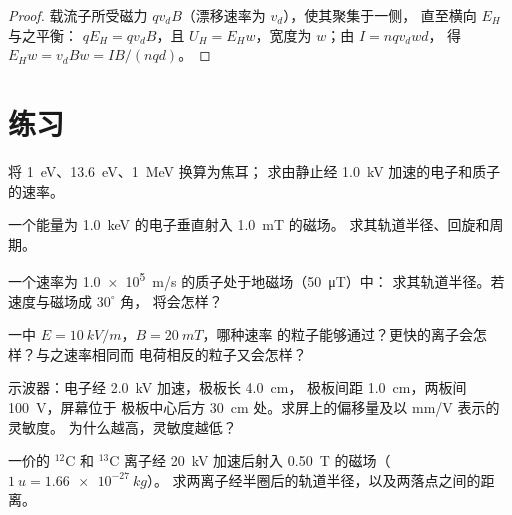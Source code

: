 \begin{proof}
载流子所受磁力 $qv_dB$（漂移速率为 $v_d$），使其聚集于一侧，
直至横向 $E_H$ 与之平衡：
$qE_H = qv_dB$，且 $U_H = E_Hw$，宽度为 $w$；由 $I = nqv_dwd$，
得 $E_Hw = v_dBw = IB/(nqd)$。
\end{proof}

\section{练习}

\begin{exercise}[$\star$]\label{exo:b1:charged-particles:1}
将 \qty{1}{eV}、\qty{13.6}{eV}、\qty{1}{MeV} 换算为焦耳；
求由静止经 \qty{1.0}{kV} 加速的电子和质子的速率。
\end{exercise}

\begin{exercise}[$\star$]\label{exo:b1:charged-particles:2}
一个能量为 \qty{1.0}{keV} 的电子垂直射入 \qty{1.0}{mT} 的磁场。
求其轨道半径、回旋和周期。
\end{exercise}

\begin{exercise}[$\star$]\label{exo:b1:charged-particles:3}
一个速率为 \qty{1.0e5}{m/s} 的质子处于地磁场（\qty{50}{\micro T}）中：
求其轨道半径。若速度与磁场成 $30^\circ$ 角，
将会怎样？
\end{exercise}

\begin{exercise}[$\star$]\label{exo:b1:charged-particles:4}
一中 $E = \qty{10}{kV/m}$，$B = \qty{20}{mT}$，哪种速率
的粒子能够通过？更快的离子会怎样？与之速率相同而
电荷相反的粒子又会怎样？
\end{exercise}

\begin{exercise}[$\star\star$]\label{exo:b1:charged-particles:5}
示波器：电子经 \qty{2.0}{kV} 加速，极板长 \qty{4.0}{cm}，
极板间距 \qty{1.0}{cm}，两板间 \qty{100}{V}，屏幕位于
极板中心后方 \qty{30}{cm} 处。求屏上的偏移量及以 mm/V 表示的灵敏度。
为什么越高，灵敏度越低？
\end{exercise}

\begin{exercise}[$\star\star$]\label{exo:b1:charged-particles:6}
一价的 $^{12}$C 和 $^{13}$C 离子经
\qty{20}{kV} 加速后射入 \qty{0.50}{T} 的磁场（$\qty{1}{u} = \qty{1.66e-27}{kg}$）。
求两离子经半圈后的轨道半径，以及两落点之间的距离。
\end{exercise}

